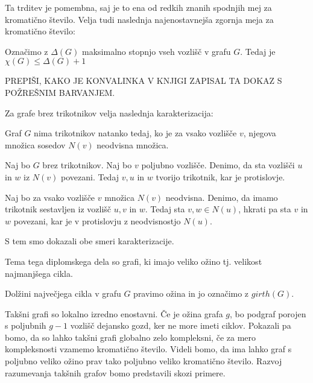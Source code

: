 \documentclass[mat1, tisk]{fmfdelo}
\begin{document}
Ta trditev je pomembna, saj je to ena od redkih znanih spodnjih mej za kromatično število. Velja tudi naslednja najenostavnejša zgornja meja za kromatično število:

    \begin{trditev}
        Označimo z $\Delta(G)$ maksimalno stopnjo vseh vozlišč v grafu $G$. Tedaj je $\chi(G) \leq \Delta(G) + 1$
        \label{zgornja_meja}
    \end{trditev}

    \begin{dokaz}
        PREPIŠI, KAKO JE KONVALINKA V KNJIGI ZAPISAL TA DOKAZ S POŽREŠNIM BARVANJEM.
    \end{dokaz}

Za grafe brez trikotnikov velja naslednja karakterizacija:

    \begin{trditev}
        Graf $G$ nima trikotnikov natanko tedaj, ko je za vsako vozlišče $v$, njegova množica sosedov $N(v)$ neodvisna množica.
        \label{karakterizacija}
    \end{trditev}

    \begin{dokaz}
        Naj bo $G$ brez trikotnikov. Naj bo $v$ poljubno vozlišče. Denimo, da sta vozlišči $u$ in $w$ iz $N(v)$ povezani. Tedaj $v, u$ in $w$ tvorijo trikotnik, kar je protislovje.

        Naj bo za vsako vozlišče $v$ množica $N(v)$ neodvisna. Denimo, da imamo trikotnik sestavljen iz vozlišč $u, v$ in $w$. Tedaj sta $v, w \in N(u)$, hkrati pa sta $v$ in $w$ povezani,
        kar je v protislovju z neodvisnostjo $N(u)$. 
        
        S tem smo dokazali obe smeri karakterizacije.
    \end{dokaz}

Tema tega diplomskega dela so grafi, ki imajo veliko ožino tj. velikost najmanjšega cikla. 

    \begin{definicija}
        Dolžini največjega cikla v grafu $G$ pravimo ožina in jo označimo z $girth(G)$.
    \end{definicija}

Takšni grafi so lokalno izredno enostavni. Če je ožina grafa $g$, bo podgraf porojen s poljubnih $g - 1$ vozlišč dejansko gozd, ker ne more 
imeti ciklov. Pokazali pa bomo, da so lahko takšni grafi globalno zelo kompleksni, če za mero kompleksnosti vzamemo kromatično število. 
Videli bomo, da ima lahko graf s poljubno veliko ožino prav tako poljubno veliko kromatično število. Razvoj razumevanja takšnih grafov 
bomo predstavili skozi primere.
\end{document}
